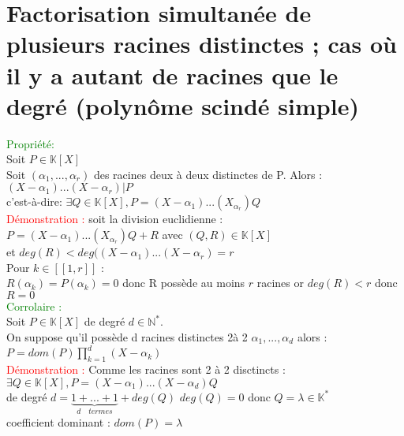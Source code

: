\documentclass{article}
\begin{document}
\section{Factorisation simultanée de plusieurs racines distinctes ; cas où il y a autant de racines que le degré (polynôme scindé simple)}
\textcolor{green}{Propriété:} \\
Soit $P \in \mathbb K [X]$ \\
Soit $(\alpha_1,...,\alpha_r)$ des racines deux à deux distinctes de P. Alors : \\
$(X-\alpha_1)...(X-\alpha_r)|P$ \\
c'est-à-dire: $\exists Q \in \mathbb K  [X], P=(X-\alpha_1)...(X_\alpha_r)Q$\\
\textcolor{red}{Démonstration :} soit la division euclidienne : \\
$P=(X-\alpha_1)...(X_\alpha_r)Q +R$  avec $(Q,R) \in \mathbb K [X]$ \\
et $deg(R)<deg((X-\alpha_1) ...(X- \alpha_r)=r$ \\
Pour $k \in [[1,r]]$ : \\
$R(\alpha_k)=P(\alpha_k)=0$ donc R possède au moins $r$ racines or $deg(R)<r$ donc $R=0$\\
\textcolor{green}{Corrolaire :} \\
Soit $P \in \mathbb K [X]$ de degré $d \in \mathbb N^*$. \\
On suppose qu'il possède d racines distinctes 2à 2 $\alpha_1,...,\alpha_d$ alors : \\
$P=dom(P) \prod_{k=1}^d (X-\alpha_k)$ \\ 
\textcolor{red}{Démonstration : } Comme les racines sont 2 à 2 disctincts : \\
$\exists Q \in \mathbb K [X], P=(X- \alpha_1)...(X- \alpha_d)Q$ \\
de degré $d=\underbrace{1+ ...+1}_{d \quad termes} + deg(Q)$ $deg(Q)=0$ donc $Q=\lambda \in \mathbb K^*$ \\
coefficient dominant : $dom(P)=\lambda$
\end{document}
